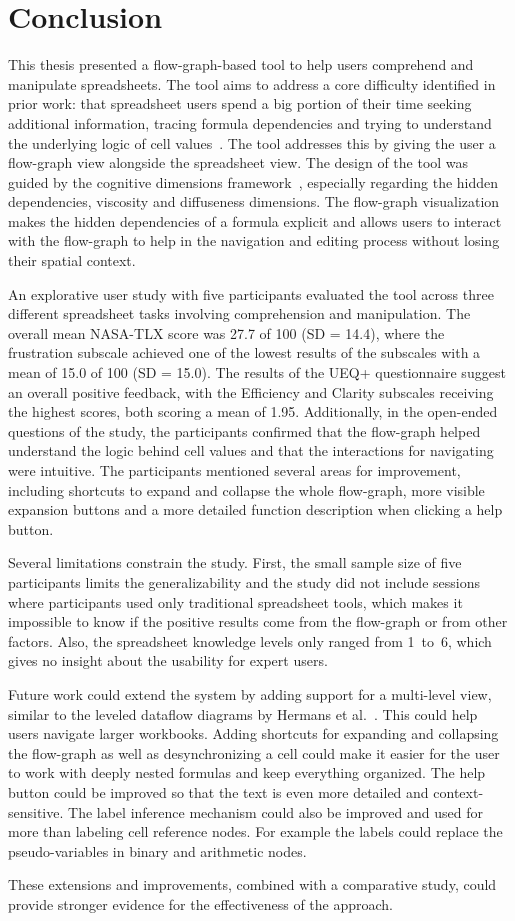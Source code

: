 \chapter{Conclusion}
This thesis presented a flow-graph-based tool to help users comprehend and manipulate spreadsheets. The tool aims to address a core difficulty identified in prior work: that spreadsheet users spend a big portion of their time seeking additional information, tracing formula dependencies and trying to understand the underlying logic of cell values~\cite{srinivasa_ragavan_spreadsheet_2021}. The tool addresses this by giving the user a flow-graph view alongside the spreadsheet view. The design of the tool was guided by the cognitive dimensions framework~\cite{green_usability_1996}, especially regarding the hidden dependencies, viscosity and diffuseness dimensions. The flow-graph visualization makes the hidden dependencies of a formula explicit and allows users to interact with the flow-graph to help in the navigation and editing process without losing their spatial context.

An explorative user study with five participants evaluated the tool across three different spreadsheet tasks involving comprehension and manipulation. The overall mean NASA-TLX score was 27.7 of 100 (SD = 14.4), where the frustration subscale achieved one of the lowest results of the subscales with a mean of 15.0 of 100 (SD = 15.0). The results of the UEQ+ questionnaire suggest an overall positive feedback, with the Efficiency and Clarity subscales receiving the highest scores, both scoring a mean of 1.95. Additionally, in the open-ended questions of the study, the participants confirmed that the flow-graph helped understand the logic behind cell values and that the interactions for navigating were intuitive. The participants mentioned several areas for improvement, including shortcuts to expand and collapse the whole flow-graph, more visible expansion buttons and a more detailed function description when clicking a help button.

Several limitations constrain the study. First, the small sample size of five participants limits the generalizability and the study did not include sessions where participants used only traditional spreadsheet tools, which makes it impossible to know if the positive results come from the flow-graph or from other factors. Also, the spreadsheet knowledge levels only ranged from 1~to~6, which gives no insight about the usability for expert users.

Future work could extend the system by adding support for a multi-level view, similar to the leveled dataflow diagrams by Hermans et al.~\cite{hermans_supporting_2011}. This could help users navigate larger workbooks. Adding shortcuts for expanding and collapsing the flow-graph as well as desynchronizing a cell could make it easier for the user to work with deeply nested formulas and keep everything organized. The help button could be improved so that the text is even more detailed and context-sensitive. The label inference mechanism could also be improved and used for more than labeling cell reference nodes. For example the labels could replace the pseudo-variables in binary and arithmetic nodes.

These extensions and improvements, combined with a comparative study, could provide stronger evidence for the effectiveness of the approach.
